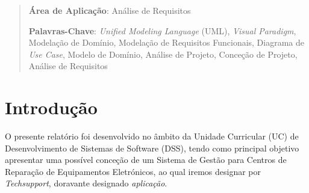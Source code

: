 \documentclass[a4paper,12pt]{scrreprt}
\begin{document}
\begin{flushleft}
\begin{abstract}
        \par \textbf{Área de Aplicação}: Análise de Requisitos
        \par \textbf{Palavras-Chave}: \textit{Unified Modeling Language} (UML), \textit{Visual Paradigm}, Modelação de Domínio, Modelação de Requisitos Funcionais, Diagrama de \textit{Use Case}, Modelo de Domínio, Análise de Projeto, Conceção de Projeto, Análise de Requisitos
    \end{abstract}
\end{flushleft}


\pagebreak



\renewcommand{\contentsname}{Índice}

\tableofcontents

\pagebreak

\listoffigures

\pagebreak







\chapter{Introdução}
O presente relatório foi desenvolvido no âmbito da Unidade Curricular (UC) de Desenvolvimento de Sistemas de Software (DSS),
tendo como principal objetivo apresentar uma possível conceção de um Sistema de Gestão para Centros de Reparação de Equipamentos Eletrónicos, ao qual iremos designar por \textit{Techsupport}, 
doravante designado \textit{aplicação}.
\end{document}
